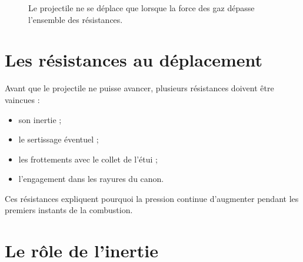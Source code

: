 \begin{figure}[htbp]
\centering


\caption{Le projectile ne se déplace que lorsque la force des gaz dépasse l'ensemble des résistances.}
\label{fig:forces_depart}

\end{figure}

\section{Les résistances au déplacement}

Avant que le projectile ne puisse avancer, plusieurs résistances doivent être
vaincues :

\begin{itemize}
    \item son inertie ;
    \item le sertissage éventuel ;
    \item les frottements avec le collet de l'étui ;
    \item l'engagement dans les rayures du canon.
\end{itemize}

Ces résistances expliquent pourquoi la pression continue d'augmenter pendant les
premiers instants de la combustion.

\section{Le rôle de l'inertie}

